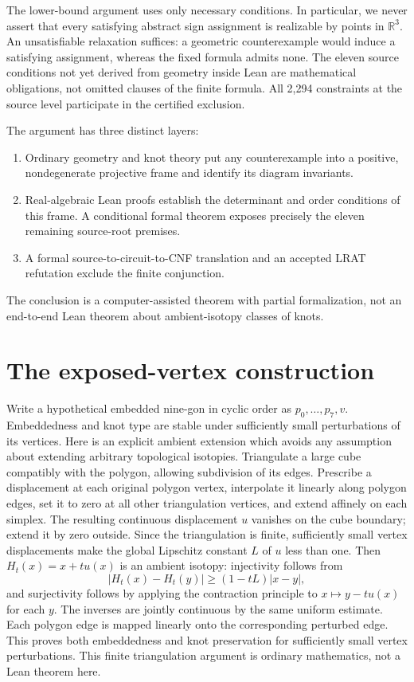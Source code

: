 \documentclass[11pt]{article}
\newcommand{\R}{\mathbb R}
\begin{document}
The lower-bound argument uses only necessary conditions. In particular,
we never assert that every satisfying abstract sign assignment is realizable
by points in $\R^3$. An unsatisfiable relaxation suffices: a geometric
counterexample would induce a satisfying assignment, whereas the fixed
formula admits none. The eleven source conditions not yet derived from
geometry inside Lean are mathematical obligations, not omitted clauses
of the finite formula. All 2,294 constraints at the source level participate
in the certified exclusion.

The argument has three distinct layers:
\begin{enumerate}
\item Ordinary geometry and knot theory put any counterexample into a
positive, nondegenerate projective frame and identify its diagram invariants.
\item Real-algebraic Lean proofs establish the determinant and order
conditions of this frame. A conditional formal theorem exposes precisely
the eleven remaining source-root premises.
\item A formal source-to-circuit-to-CNF translation and an accepted LRAT
refutation exclude the finite conjunction.
\end{enumerate}
The conclusion is a computer-assisted theorem with partial formalization,
not an end-to-end Lean theorem about ambient-isotopy classes of knots.

\section{The exposed-vertex construction}\label{sec:roof}
Write a hypothetical embedded nine-gon in cyclic order as
$p_0,\ldots,p_7,v$. Embeddedness and knot type are stable under sufficiently
small perturbations of its vertices. Here is an explicit ambient extension
which avoids any assumption about extending arbitrary topological isotopies.
Triangulate a large cube compatibly with the polygon, allowing subdivision
of its edges. Prescribe a displacement at each original polygon vertex,
interpolate it linearly along polygon edges, set it to zero at all other
triangulation vertices, and extend affinely on each simplex. The resulting
continuous displacement $u$ vanishes on the cube boundary; extend it by
zero outside. Since the triangulation is finite, sufficiently small vertex
displacements make the global Lipschitz constant $L$ of $u$ less than one.
Then $H_t(x)=x+t u(x)$ is an ambient isotopy: injectivity follows from
\[
 |H_t(x)-H_t(y)|\geq(1-tL)|x-y|,
\]
and surjectivity follows by applying the contraction principle to
$x\mapsto y-t u(x)$ for each $y$. The inverses are jointly continuous
by the same uniform estimate. Each polygon edge is mapped linearly onto
the corresponding perturbed edge. This proves both embeddedness and knot
preservation for sufficiently small vertex perturbations. This finite
triangulation argument is ordinary mathematics, not a Lean theorem here.
\end{document}
